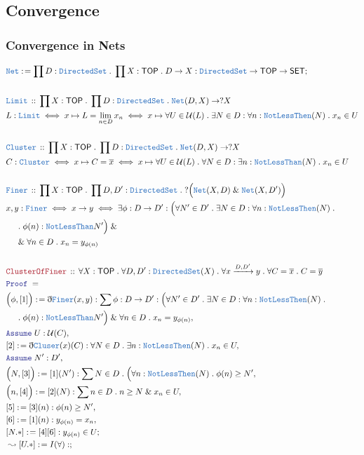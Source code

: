 \documentclass[12pt]{scrartcl}
\newcommand{\TYPE}[1]{\textcolor{NavyBlue}{\mathtt{#1}}}
\newcommand{\LOGIC}[1]{\textcolor{Blue}{\mathtt{#1}}}
\newcommand{\THM}[1]{\textcolor{Maroon}{\mathtt{#1}}}
\renewcommand{\.}{\; . \;}
\newcommand{\de}{: \kern 0.1pc =}
\newcommand{\Theorem}[2]{& \THM{#1} \, :: \, #2 \\ & \Proof = \\ }
\newcommand{\DeclareType}[2]{& \TYPE{#1} \, :: \, #2 \\}
\newcommand{\DefineNamedType}[4]{& #1 : \TYPE{#2} \iff #3 \iff #4 \\}
\newcommand{\NewLine}{\\ & \kern 1pc}
\newcommand{\Page}[1]{ \begin{align*} #1 \end{align*}   }
\newcommand{ \bd }{ \ByDef }
\renewcommand{\And}{\; \& \;}
\newcommand{\Arrow}{\xrightarrow}
\newcommand{\Say}[3]{& #1 \de #2 : #3, \\}
\newcommand{\Conclude}[3]{& #1 \de #2 : #3; \\}
\newcommand{\DeriveConclude}[3]{& \leadsto #1 \de #2 : #3 ; \\}
\newcommand{\Assume}[2]{& \LOGIC{Assume} \; #1 : #2, \\}
\newcommand{\ByDef}{\eth}
\newcommand{\Proof}{\LOGIC{Proof} \; }
\newcommand{\SET}{\mathsf{SET}}
\newcommand{\TOP}{\mathsf{TOP}}
\newcommand{\U}{\mathcal{U}}
\begin{document}
\subsection{Convergence}
\subsubsection{Convergence in Nets}
\Page{
	\Conclude{\TYPE{Net}}{\prod D : \TYPE{DirectedSet} \. \prod X : \TOP \. D \to X }
	{
		\TYPE{DirectedSet} \to \TOP \to \SET
	}
	\\
	\DeclareType{Limit}{ \prod X : \TOP \. \prod D : \TYPE{DirectedSet} \. \TYPE{Net}(D,X) \to ?X}
	\DefineNamedType{L}{Limit}{ x \mapsto  L = \lim_{n \in D} x_n}
	{
		x \mapsto
		\forall U \in \U(L) \.
		\exists N \in D : 
		\forall n : \TYPE{NotLessThen}(N) \.
		x_n \in U
	}
	\\
	\DeclareType{Cluster}{ \prod X : \TOP \. \prod D : \TYPE{DirectedSet} \. \TYPE{Net}(D,X) \to ?X}
	\DefineNamedType{C}{Cluster}{ x \mapsto  C = \overline{x}}
	{
		x \mapsto
		\forall U \in \U(L) \.
		\forall N \in D : 
		\exists n : \TYPE{NotLessThan}(N) \.
		x_n \in U
	}
	\\
	\DeclareType{Finer}{
		\prod X : \TOP \. 
		\prod D,D' : \TYPE{DirectedSet}  \. 
		?\Big( \TYPE{Net}(X,D) \And \TYPE{Net}(X,D') \Big)
	}
	\DefineNamedType{x,y}{Finer}{x \to y}
	{
		\exists \phi : D \to D' : 
		\Big(\forall N' \in D' \. \exists N \in D : \forall n : \TYPE{NotLessThen}(N) \. \NewLine \.
			\phi(n) : \TYPE{NotLessThan} N'\Big) \And \NewLine \And 
		\forall n \in D \.  x_n = y_{\phi(n)} 
	}
	\\
	\Theorem{ClusterOfFiner}
	{
		\forall X : \TOP \.
		\forall D,D' : \TYPE{DirectedSet}(X) \.
		\forall  x \Arrow{D,D'} y \.
		\forall C = \overline{x} \.
		C = \overline{y}
	}
	\Say{\Big(\phi, [1] \Big)}{ \bd \TYPE{Finer}(x,y) }
	{
		\sum \phi : D \to D' : 
		\Big(\forall N' \in D' \. \exists N \in D : \forall n : \TYPE{NotLessThen}(N) \. \NewLine \.
			\phi(n) : \TYPE{NotLessThan} N'\Big) \And 
		\forall n \in D \.  x_n = y_{\phi(n)} 
	}
	\Assume{U}{\U(C)}
	\Say{[2]}{\bd \TYPE{Cluser}(x)(C) }
	{
		\forall N \in D \. \exists n : \TYPE{NotLessThen}(N) \. x_n \in U
	}
	\Assume{N'}{D'}
	\Say{\Big(N,[3]\Big)}{[1](N')}{
		\sum N \in D \.  \Big( 
		\forall n : \TYPE{NotLessThen}(N) \. 
		\phi(n) \ge N'
	}
	\Say{\Big(n,[4]\Big)}{[2](N)}
	{
		\sum n \in D \. n \ge N  \And x_n \in U
	}
	\Say{[5]}{[3](n)}{\phi(n) \ge N'}
	\Say{[6]}{[1](n)}{  y_{\phi(n)} = x_n   }
	\Conclude{[N.*]}{[4][6]}{  y_{\phi(n)} \in U  }
	\DeriveConclude{[U.*]}{ I(\forall) }{ 
}}
\end{document}
